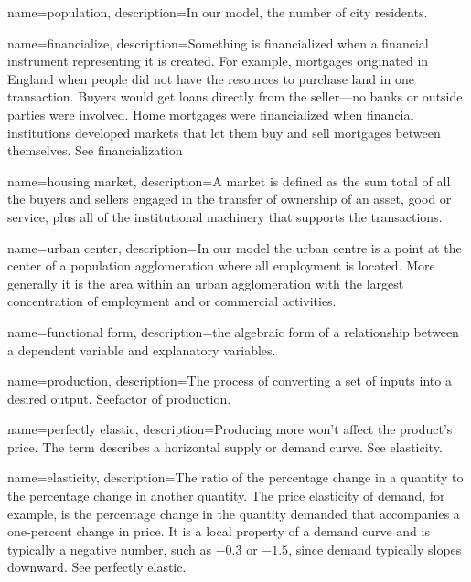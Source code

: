{
name=population,
description={In our model, the number of city residents. }
}

{
name=financialize,
description={Something is financialized when a financial instrument representing it is created. For example, mortgages originated in England when people did not have the resources to purchase land in one transaction. Buyers would get loans directly from the seller---no banks or outside parties were involved. Home mortgages were financialized when financial institutions developed markets that let them buy and sell mortgages between themselves.  See \gls{financialization}}
}

{
name=housing market,
description={A market is defined as the sum total of all the buyers and sellers engaged in the transfer of ownership of an asset, good or service, plus all of the institutional machinery that supports the transactions. }
}

{
name=urban center,
description={In our model the urban centre is a point at the center of a population \gls{agglomeration} where all employment is located. More generally it is the area within an urban \gls{agglomeration} with the largest concentration of employment and or commercial activities.} 
}

{
name=functional form,
description={the algebraic form of a relationship between a dependent variable and explanatory variables.}
}

{
name=production,
description={The process of converting a set of \glspl{input} into a desired \gls{output}. See\gls{factor of production}.}
}

{
name=perfectly elastic,
description={Producing more won't affect the product's price. The term describes a  horizontal supply or demand curve. See \gls{elasticity}.} %
}

{
name=elasticity,
description={The ratio of the percentage change in a quantity to the percentage change in another quantity. The price elasticity of demand, for  example, is the percentage change in the quantity demanded that accompanies a one-percent change in price. It is a local property of a demand curve and is typically  a negative number, such as $-0.3$ or $-1.5$, since demand typically slopes downward. See \gls{perfectly elastic}.}
}

